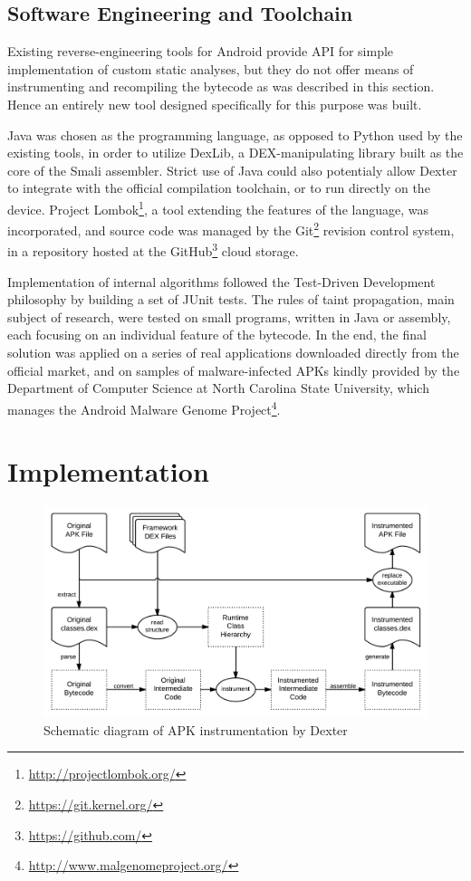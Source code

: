 \documentclass[12pt,twoside,notitlepage]{report}
\newcommand{\weblink}[1] {\footnote{\scriptsize\url{#1}}}
\begin{document}
\section{Software Engineering and Toolchain}

Existing reverse-engineering tools for Android provide API for simple implementation of custom static analyses, but they do not offer means of instrumenting and recompiling the bytecode as was described in this section. Hence an entirely new tool designed specifically for this purpose was built.

Java was chosen as the programming language, as opposed to Python used by the existing tools, in order to utilize DexLib, a DEX-manipulating library built as the core of the Smali assembler. Strict use of Java could also potentialy allow Dexter to integrate with the official compilation toolchain, or to run directly on the device. Project Lombok\weblink{http://projectlombok.org/}, a tool extending the features of the language, was incorporated, and source code was managed by the Git\weblink{https://git.kernel.org/} revision control system, in a repository hosted at the GitHub\weblink{https://github.com/} cloud storage.

Implementation of internal algorithms followed the Test-Driven Development philosophy by building a set of JUnit tests. The rules of taint propagation, main subject of research, were tested on small programs, written in Java or assembly, each focusing on an individual feature of the bytecode. In the end, the final solution was applied on a series of real applications downloaded directly from the official market, and on samples of malware-infected APKs kindly provided by the Department of Computer Science at North Carolina State University, which manages the Android Malware Genome Project\weblink{http://www.malgenomeproject.org/}.

\cleardoublepage
\chapter{Implementation}

\begin{figure}
	\centerline{	
		\includegraphics[width=\textwidth]{figs/fig_implementation_overview.png}
	}
	\caption{Schematic diagram of APK instrumentation by Dexter}
	\label{fig:Implementation_Overview}
\end{figure}
\end{document}
